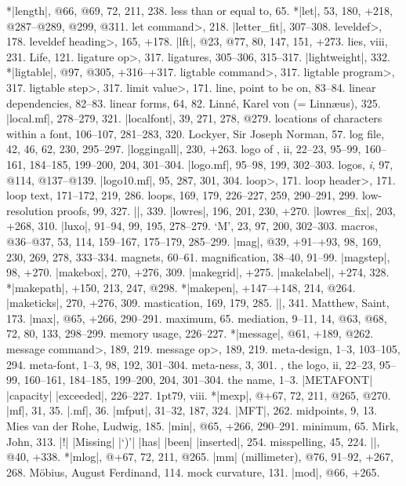 *|length|, @66, @69, 72, 211, 238.
less than or equal to, 65.
*|let|, 53, 180, +218, @287--@289, @299, @311.
\<let command>, 218.
|letter_fit|, 307--308.
\<leveldef>, 178.
\<leveldef heading>, 165, +178.
|lft|, @23, @77, 80, 147, 151, +273.
lies, viii, 231.
Life, 121.
\<ligature op>, 317.
ligatures, 305--306, 315--317.
|lightweight|, 332.
*|ligtable|, @97, @305, +316--+317.
\<ligtable command>, 317.
\<ligtable program>, 317.
\<ligtable step>, 317.
\<limit value>, 171.
line, point to be on, 83--84.
linear dependencies, 82--83.
linear forms, 64, 82.
Linn\'e, Karel von (= Linn\ae us), 325.
|local.mf|, 278--279, 321.
|localfont|, 39, 271, 278, @279.
locations of characters within a font, 106--107, 281--283, 320.
Lockyer, Sir Joseph Norman, 57.
log file, 42, 46, 62, 230, 295--297.
|loggingall|, 230, +263.
logo of \MF, ii, 22--23, 95--99, 160--161, 184--185, 199--200, 204, 301--304.
|logo.mf|, 95--98, 199, 302--303.
logos, {\it i},  97, @114, @137--@139.
|logo10.mf|, 95, 287, 301, 304.
\<loop>, 171.
\<loop header>, 171.
loop text, 171--172, 219, 286.
loops, 169, 179, 226--227, 259, 290--291, 299.
low-resolution proofs, 99, 327.
|\lowers|, 339.
|lowres|, 196, 201, 230, +270.
|lowres_fix|, 203, +268, 310.
|luxo|, 91--94, 99, 195, 278--279.
\newletter
`M', 23, 97, 200, 302--303.
macros, @36--@37, 53, 114, 159--167, 175--179, 285--299.
|mag|, @39, +91--+93, 98, 169, 230, 269, 278, 333--334.
magnets, 60--61.
magnification, 38--40, 91--99.
|magstep|, 98, +270.
|makebox|, 270, +276, 309.
|makegrid|, +275.
|makelabel|, +274, 328.
*|makepath|, +150, 213, 247, @298.
*|makepen|, +147--+148, 214, @264.
|maketicks|, 270, +276, 309.
mastication, 169, 179, 285.
|\math|, 341.
Matthew, Saint, 173.
|max|, @65, +266, 290--291.
maximum, 65.
mediation, 9--11, 14, @63, @68, 72, 80, 133, 298--299.
memory usage, 226--227.
*|message|, @61, +189, @262.
\<message command>, 189, 219.
\<message op>, 189, 219.
meta-design, 1--3, 103--105, 294.
meta-font, 1--3, 98, 192, 301--304.
meta-ness, 3, 301.
\MF, the logo, ii, 22--23, 95--99, 160--161, 184--185, 199--200,
 204, 301--304.
\sub the name, 1--3.
|METAFONT| |capacity| |exceeded|, 226--227.
\MF\kern1pt79, viii.
*|mexp|, @+67, 72, 211, @265, @270.
|mf|, 31, 35.
|.mf|, 36.
|mfput|, 31--32, 187, 324.
|MFT|, 262.
midpoints, 9, 13.
Mies van der Rohe, Ludwig, 185.
|min|, @65, +266, 290--291.
minimum, 65.
Mirk, John, 313.
|!| |Missing| |`)'| |has| |been| |inserted|, 254.
misspelling, 45, 224.
|\mixture|, @40, +338.
*|mlog|, @+67, 72, 211, @265.
|mm| (millimeter), @76, 91--92, +267, 268.
M\"obius, August Ferdinand, 114.
mock curvature, 131.
|mod|, @66, +265.
